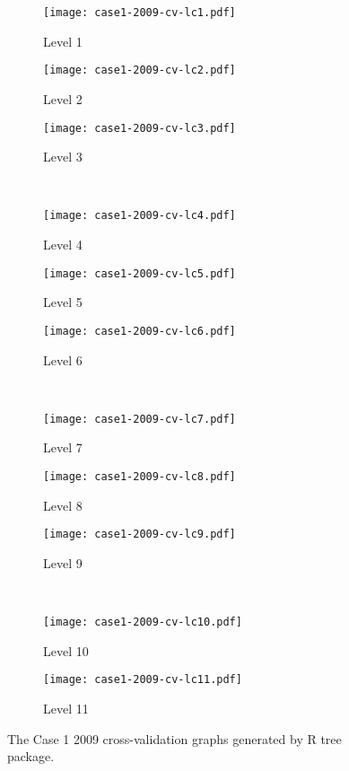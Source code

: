 \begin{appendices}
\begin{figure}[!ht] \centering
	\captionsetup[subfigure]{width=2.0in}
	\begin{subfigure}[t]{0.32\textwidth}
		\texttt{[image: case1-2009-cv-lc1.pdf]}
		\caption{Level 1}
	\end{subfigure}
	\begin{subfigure}[t]{0.32\textwidth}
		\texttt{[image: case1-2009-cv-lc2.pdf]}
		\caption{Level 2}
	\end{subfigure}
	\begin{subfigure}[t]{0.32\textwidth}
		\texttt{[image: case1-2009-cv-lc3.pdf]}
		\caption{Level 3}
	\end{subfigure}\\
	\vspace{5pt}
	\begin{subfigure}[t]{0.32\textwidth}
		\texttt{[image: case1-2009-cv-lc4.pdf]}
		\caption{Level 4}
	\end{subfigure}
	\begin{subfigure}[t]{0.32\textwidth}
		\texttt{[image: case1-2009-cv-lc5.pdf]}
		\caption{Level 5}
	\end{subfigure}
	\begin{subfigure}[t]{0.32\textwidth}
		\texttt{[image: case1-2009-cv-lc6.pdf]}
		\caption{Level 6}
	\end{subfigure}\\
	\vspace{5pt}	
	\begin{subfigure}[t]{0.32\textwidth}
		\texttt{[image: case1-2009-cv-lc7.pdf]}
		\caption{Level 7}
	\end{subfigure}
	\begin{subfigure}[t]{0.32\textwidth}
		\texttt{[image: case1-2009-cv-lc8.pdf]}
		\caption{Level 8}
	\end{subfigure}
	\begin{subfigure}[t]{0.32\textwidth}
		\texttt{[image: case1-2009-cv-lc9.pdf]}
		\caption{Level 9}
	\end{subfigure}\\
	\vspace{5pt}
	\begin{subfigure}[t]{0.32\textwidth}
		\texttt{[image: case1-2009-cv-lc10.pdf]}
		\caption{Level 10}
	\end{subfigure}
	\begin{subfigure}[t]{0.32\textwidth}
		\texttt{[image: case1-2009-cv-lc11.pdf]}
		\caption{Level 11}
	\end{subfigure}
	\vspace{5pt}
	\caption[The Case 1 2009 cross-validation graphs generated by R tree package.]{The Case 1 2009 cross-validation graphs generated by R tree package.}
	\label{fig: appendix-fig.c6.cv}
\end{figure}


\end{appendices}
